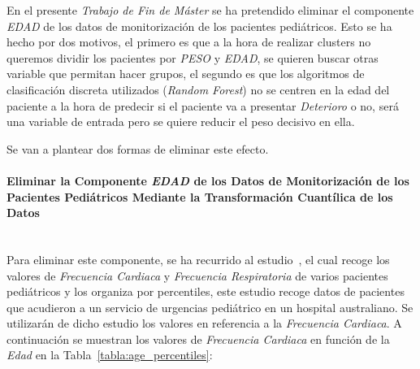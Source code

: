 En el presente \textit{Trabajo de Fin de Máster} se ha pretendido eliminar el componente \textit{EDAD} de los datos de monitorización de los pacientes pediátricos. Esto se ha hecho por dos motivos, el primero es que a la hora de realizar clusters no queremos dividir los pacientes por \textit{PESO} y \textit{EDAD}, se quieren buscar otras variable que permitan hacer grupos, el segundo es que los algoritmos de clasificación discreta utilizados (\textit{Random Forest}) no se centren en la edad del paciente a la hora de predecir si el paciente va a presentar \textit{Deterioro} o no, será una variable de entrada pero se quiere reducir el peso decisivo en ella.

Se van a plantear dos formas de eliminar este efecto.

\paragraph{Eliminar la Componente \textit{EDAD} de los Datos de Monitorización de los Pacientes Pediátricos Mediante la Transformación Cuantílica de los Datos}\label{sec:eliminar-edad-1} \\

Para eliminar este componente, se ha recurrido al estudio~\cite{percentilesFenton2015}, el cual recoge los valores de \textit{Frecuencia Cardiaca} y \textit{Frecuencia Respiratoria}  de varios pacientes pediátricos y los organiza por percentiles, este estudio recoge datos de pacientes que acudieron a un servicio de urgencias pediátrico en un hospital australiano. Se utilizarán de dicho estudio los valores en referencia a la \textit{Frecuencia Cardiaca}. A continuación se muestran los valores de \textit{Frecuencia Cardiaca} en función de la \textit{Edad} en la Tabla~\ref{tabla:age_percentiles}:

